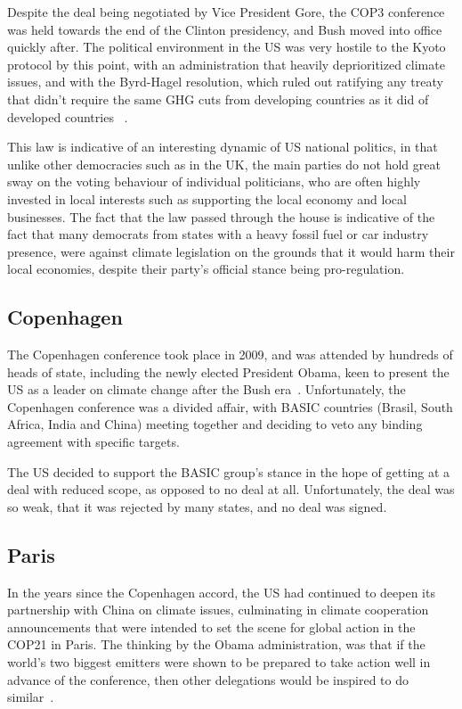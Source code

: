 Despite the deal being negotiated by Vice President Gore, the COP3
conference was held towards the end of the Clinton presidency, and
Bush moved into office quickly after. The political environment in the
US was very hostile to the Kyoto protocol by this point, with an
administration that heavily deprioritized climate issues, and with the
Byrd-Hagel resolution, which ruled out ratifying any treaty that
didn’t require the same GHG cuts from developing countries as it did
of developed countries ~\cite{harrison2010united}.

This law is indicative of an interesting dynamic of US national
politics, in that unlike other democracies such as in the UK, the main
parties do not hold great sway on the voting behaviour of individual
politicians, who are often highly invested in local interests such as
supporting the local economy and local businesses. The fact that the law passed
through the house is indicative of the fact that many democrats from states with
a heavy fossil fuel or car industry presence, were against climate legislation
on the grounds that it would harm their local economies, despite their party's
official stance being pro-regulation.

\subsection{Copenhagen}

The Copenhagen conference took place in 2009, and was attended by
hundreds of heads of state, including the newly elected President
Obama, keen to present the US as a leader on climate change after the
Bush era~\cite{parker2018climate}. Unfortunately, the Copenhagen conference was a divided
affair, with BASIC countries (Brasil, South Africa, India and China) meeting
together and deciding to veto any binding agreement with specific
targets.

The US decided to support the BASIC group's stance in the hope of getting at a deal
with reduced scope, as opposed to no deal at all. Unfortunately, the deal was so
weak, that it was rejected by many states, and no deal was signed.

\subsection{Paris}

In the years since the Copenhagen accord, the US had continued to
deepen its partnership with China on climate issues, culminating in
climate cooperation announcements that were intended to set the scene
for global action in the COP21 in Paris. The thinking by the Obama
administration, was that if the world’s two biggest emitters were
shown to be prepared to take action well in advance of the conference,
then other delegations would be inspired to do similar~\cite{usPressRelease}.

